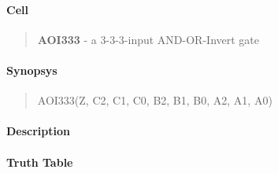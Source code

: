 \label{AOI333}
\paragraph{Cell}
\begin{quote}
    \textbf{AOI333} - a 3-3-3-input AND-OR-Invert gate
\end{quote}

\paragraph{Synopsys}
\begin{quote}
    AOI333(Z, C2, C1, C0, B2, B1, B0, A2, A1, A0)
\end{quote}

\paragraph{Description}



\paragraph{Truth Table}


